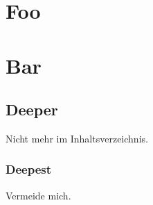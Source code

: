 \section{Foo}


\section{Bar}


\subsection{Deeper}
Nicht mehr im Inhaltsverzeichnis.

\subsubsection{Deepest}
Vermeide mich.